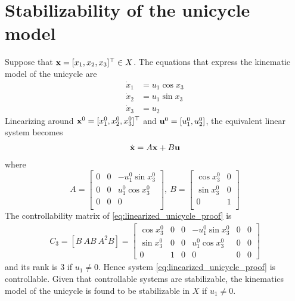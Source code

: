 \section{Stabilizability of the unicycle model}
\label{proof:stabilizability_unicycle}

Suppose that $\bm{\mathbf{x}} = [x_1, x_2, x_3]^{\top} \in X$.
The equations that express the kinematic model of the unicycle are
\begin{align}
  \dot{x}_1       &= u_1 \cos x_3 \\
  \dot{x}_2       &= u_1 \sin x_3 \\
  \dot{x}_3       &= u_2
\end{align}
Linearizing around $\bm{\mathbf{x}}^0 = [x_1^0, x_2^0, x_3^0]^{\top}$ and
$\bm{\mathbf{u}}^0 = [u_1^0, u_2^0]$, the equivalent linear system becomes
\begin{align}
  \dot{\bm{\mathbf{x}}}= A \bm{\mathbf{x}} + B \bm{\mathbf{u}}
  \label{eq:linearized_unicycle_proof}
\end{align}
where
\begin{equation}
  A =
  \begin{bmatrix}
    0 & 0 & -u_1^0 \sin x_3^0 \\
    0 & 0 & u_1^0 \cos x_3^0 \\
    0 & 0 & 0\\
  \end{bmatrix},\
  B =
  \begin{bmatrix}
    \cos x_3^0 & 0 \\
    \sin x_3^0 & 0 \\
    0 & 1 \\
  \end{bmatrix}
\end{equation}
The controllability matrix of \eqref{eq:linearized_unicycle_proof} is
\begin{align}
  C_3 = [B\ AB\ A^2B] =
  \begin{bmatrix}
    \cos x_3^0 & 0 & 0 & -u_1^0 \sin x_3^0 & 0 & 0\\
    \sin x_3^0 & 0 & 0 & u_1^0 \cos x_3^0 & 0 & 0 \\
    0 & 1 & 0 & 0 & 0 & 0
  \end{bmatrix}
\end{align}
and its rank is 3 if $u_1 \neq 0$. Hence
system \eqref{eq:linearized_unicycle_proof} is controllable. Given that
controllable systems are stabilizable, the kinematics model of the unicycle is
found to be stabilizable in $X$ if $u_1 \neq 0$.
